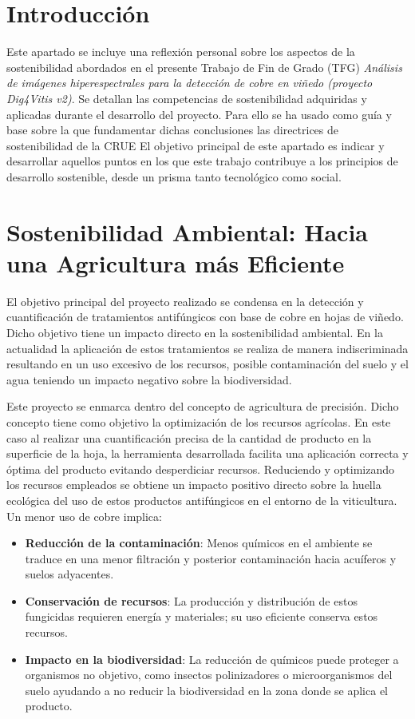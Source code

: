 
\section{Introducción}
Este apartado se incluye una reflexión personal sobre los aspectos de la sostenibilidad abordados en el presente Trabajo de Fin de Grado (TFG)  \textit{Análisis de imágenes hiperespectrales para la detección de cobre en viñedo (proyecto Dig4Vitis v2)}. Se detallan las competencias de sostenibilidad adquiridas y aplicadas durante el desarrollo del proyecto. Para ello se ha usado como guía y base sobre la que fundamentar dichas conclusiones las directrices de sostenibilidad de la CRUE \cite{Crue2012Sostenibilidad}
El objetivo principal de este apartado es indicar y desarrollar aquellos puntos en los que este trabajo contribuye a los principios de desarrollo sostenible, desde un prisma tanto tecnológico como social.

\section{Sostenibilidad Ambiental: Hacia una Agricultura más Eficiente}

El objetivo principal del proyecto realizado se condensa en la detección y cuantificación de tratamientos antifúngicos con base de cobre en hojas de viñedo. Dicho objetivo tiene un impacto directo en la sostenibilidad ambiental. En la actualidad la aplicación de estos tratamientos se realiza de manera indiscriminada resultando en un uso excesivo de los recursos, posible contaminación del suelo y el agua teniendo un impacto negativo sobre la biodiversidad.

Este proyecto se enmarca dentro del concepto de agricultura de precisión. Dicho concepto tiene como objetivo la optimización de los recursos agrícolas. En este caso al realizar una cuantificación precisa de la cantidad de producto en la superficie de la hoja, la herramienta desarrollada facilita una aplicación correcta y óptima del producto evitando desperdiciar recursos. Reduciendo y optimizando los recursos empleados se obtiene un impacto positivo directo sobre la huella ecológica del uso de estos productos antifúngicos en el entorno de la viticultura. Un menor uso de cobre implica:
\begin{itemize}
    \item \textbf{Reducción de la contaminación}: Menos químicos en el ambiente se traduce en una menor filtración y posterior contaminación hacia acuíferos y suelos adyacentes.
    \item \textbf{Conservación de recursos}: La producción y distribución de estos fungicidas requieren energía y materiales; su uso eficiente conserva estos recursos.
    \item \textbf{Impacto en la biodiversidad}: La reducción de químicos puede proteger a organismos no objetivo, como insectos polinizadores o microorganismos del suelo ayudando a no reducir la biodiversidad en la zona donde se aplica el producto.

\end{itemize}


